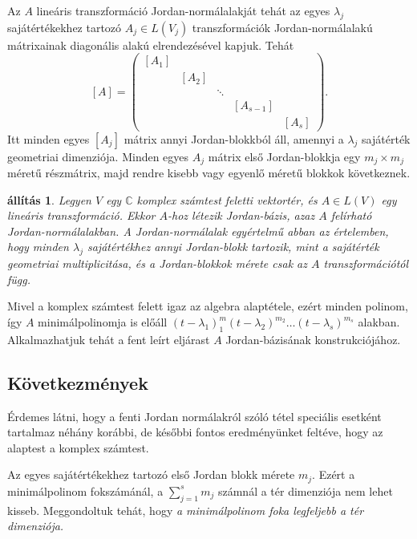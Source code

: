 \documentclass[9pt, a4paper, showtrims]{memoir}
\makeatletter
\renewenvironment{proof}[1][\proofname]
    {\par\pushQED{\qed}%
    \normalfont \topsep6\p@\@plus6\p@\relax
    \trivlist
    \item[\hskip\labelsep
        \itshape
    #1\@addpunct{:}]\ignorespaces}
    {\popQED\endtrivlist\@endpefalse}
\theoremstyle{plain}
\newtheorem{proposition}{állítás}[chapter]
\theoremstyle{remark}
\theoremstyle{definition}
\makeatother
\begin{document}
Az $A$ lineáris transzformáció Jordan-normálalakját tehát az egyes $\lambda_j$ sajátértékekhez tartozó $A_j\in L\left( V_j \right)$
transzformációk Jordan-normálalakú mátrixainak diagonális alakú elrendezésével kapjuk.
Tehát
\[
    [A]
    =
    \begin{pmatrix}
        [A_1]&&&&\\
        &\!\!\![A_2]&&&\\
        &\!\!\!&\ddots&&\\
        &\!\!\!&&\!\!\![A_{s-1}]&\\
        &\!\!\!&&\!\!\!&\!\!\![A_s]
    \end{pmatrix}.
\]
Itt minden egyes $[A_j]$ mátrix annyi Jordan-blokkból áll,
amennyi a $\lambda_j$ sajátérték geometriai dimenziója.
Minden egyes $A_j$ mátrix első Jordan-blokkja
egy $m_j\times m_j$ méretű részmátrix, 
majd rendre kisebb vagy egyenlő méretű blokkok következnek.
\begin{proposition}
    Legyen $V$ egy $\mathbb{C}$ komplex számtest feletti vektortér,
    és $A\in L\left( V \right)$ egy lineáris transzformáció.
    Ekkor $A$-hoz létezik Jordan-bázis, azaz $A$ felírható Jordan-normálalakban.
    A Jordan-normálalak egyértelmű abban az értelemben,
    hogy minden $\lambda_j$ sajátértékhez annyi Jordan-blokk tartozik, mint
    a sajátérték geometriai multiplicitása, és a Jordan-blokkok mérete csak az $A$ transzformációtól függ.
\end{proposition}
\begin{proof}
    Mivel a komplex számtest felett igaz az algebra alaptétele,
    ezért minden polinom, így $A$ minimálpolinomja is előáll
    $\left( t-\lambda_1 \right)^m_1\left( t-\lambda_2 \right)^{m_2}\dots\left( t-\lambda_s \right)^{m_s}$
    alakban.
    Alkalmazhatjuk tehát a fent leírt eljárast $A$ Jordan-bázisának konstrukciójához.
\end{proof}

\subsection{Következmények}
Érdemes látni,
hogy a fenti Jordan normálakról szóló tétel speciális esetként tartalmaz néhány korábbi, 
de későbbi fontos eredményünket feltéve, hogy az alaptest a komplex számtest.

Az egyes sajátértékekhez tartozó első Jordan blokk mérete $m_j$.
Ezért a minimálpolinom fokszámánál, a $\sum_{j=1}^sm_j$ számnál a tér dimenziója nem lehet kisseb.
Meggondoltuk tehát, hogy \emph{a minimálpolinom foka legfeljebb  a tér dimenziója.}
\end{document}
